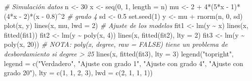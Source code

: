 \documentclass[
  spanish,
]{book}
\newenvironment{Shaded}{\begin{snugshade}}{\end{snugshade}}
\newcommand{\AttributeTok}[1]{\textcolor[rgb]{0.77,0.63,0.00}{#1}}
\newcommand{\CommentTok}[1]{\textcolor[rgb]{0.56,0.35,0.01}{\textit{#1}}}
\newcommand{\DecValTok}[1]{\textcolor[rgb]{0.00,0.00,0.81}{#1}}
\newcommand{\FloatTok}[1]{\textcolor[rgb]{0.00,0.00,0.81}{#1}}
\newcommand{\FunctionTok}[1]{\textcolor[rgb]{0.00,0.00,0.00}{#1}}
\newcommand{\NormalTok}[1]{#1}
\newcommand{\OtherTok}[1]{\textcolor[rgb]{0.56,0.35,0.01}{#1}}
\newcommand{\SpecialCharTok}[1]{\textcolor[rgb]{0.00,0.00,0.00}{#1}}
\newcommand{\StringTok}[1]{\textcolor[rgb]{0.31,0.60,0.02}{#1}}
\theoremstyle{break}
\theoremstyle{definition}
\theoremstyle{definition}
\theoremstyle{definition}
\theoremstyle{definition}
\theoremstyle{remark}
\begin{document}
\begin{Shaded}
\begin{Highlighting}[]
\CommentTok{\# Simulación datos}
\NormalTok{n }\OtherTok{\textless{}{-}} \DecValTok{30}
\NormalTok{x }\OtherTok{\textless{}{-}} \FunctionTok{seq}\NormalTok{(}\DecValTok{0}\NormalTok{, }\DecValTok{1}\NormalTok{, }\AttributeTok{length =}\NormalTok{ n)}
\NormalTok{mu }\OtherTok{\textless{}{-}} \DecValTok{2} \SpecialCharTok{+} \DecValTok{4}\SpecialCharTok{*}\NormalTok{(}\DecValTok{5}\SpecialCharTok{*}\NormalTok{x }\SpecialCharTok{{-}} \DecValTok{1}\NormalTok{)}\SpecialCharTok{*}\NormalTok{(}\DecValTok{4}\SpecialCharTok{*}\NormalTok{x }\SpecialCharTok{{-}} \DecValTok{2}\NormalTok{)}\SpecialCharTok{*}\NormalTok{(x }\SpecialCharTok{{-}} \FloatTok{0.8}\NormalTok{)}\SpecialCharTok{\^{}}\DecValTok{2} \CommentTok{\# grado 4}
\NormalTok{sd }\OtherTok{\textless{}{-}} \FloatTok{0.5}
\FunctionTok{set.seed}\NormalTok{(}\DecValTok{1}\NormalTok{)}
\NormalTok{y }\OtherTok{\textless{}{-}}\NormalTok{ mu }\SpecialCharTok{+} \FunctionTok{rnorm}\NormalTok{(n, }\DecValTok{0}\NormalTok{, sd)}
\FunctionTok{plot}\NormalTok{(x, y) }
\FunctionTok{lines}\NormalTok{(x, mu, }\AttributeTok{lwd =} \DecValTok{2}\NormalTok{)}
\CommentTok{\# Ajuste de los modelos}
\NormalTok{fit1 }\OtherTok{\textless{}{-}} \FunctionTok{lm}\NormalTok{(y }\SpecialCharTok{\textasciitilde{}}\NormalTok{ x)}
\FunctionTok{lines}\NormalTok{(x, }\FunctionTok{fitted}\NormalTok{(fit1))}
\NormalTok{fit2 }\OtherTok{\textless{}{-}} \FunctionTok{lm}\NormalTok{(y }\SpecialCharTok{\textasciitilde{}} \FunctionTok{poly}\NormalTok{(x, }\DecValTok{4}\NormalTok{))}
\FunctionTok{lines}\NormalTok{(x, }\FunctionTok{fitted}\NormalTok{(fit2), }\AttributeTok{lty =} \DecValTok{2}\NormalTok{)}
\NormalTok{fit3 }\OtherTok{\textless{}{-}} \FunctionTok{lm}\NormalTok{(y }\SpecialCharTok{\textasciitilde{}} \FunctionTok{poly}\NormalTok{(x, }\DecValTok{20}\NormalTok{)) }
\CommentTok{\# NOTA: poly(x, degree, raw = FALSE) tiene un problema de desbordamiento si degree \textgreater{} 25}
\FunctionTok{lines}\NormalTok{(x, }\FunctionTok{fitted}\NormalTok{(fit3), }\AttributeTok{lty =} \DecValTok{3}\NormalTok{)}
\FunctionTok{legend}\NormalTok{(}\StringTok{"topright"}\NormalTok{, }\AttributeTok{legend =} \FunctionTok{c}\NormalTok{(}\StringTok{"Verdadero"}\NormalTok{, }\StringTok{"Ajuste con grado 1"}\NormalTok{, }
                              \StringTok{"Ajuste con grado 4"}\NormalTok{, }\StringTok{"Ajuste con grado 20"}\NormalTok{), }
       \AttributeTok{lty =} \FunctionTok{c}\NormalTok{(}\DecValTok{1}\NormalTok{, }\DecValTok{1}\NormalTok{, }\DecValTok{2}\NormalTok{, }\DecValTok{3}\NormalTok{), }\AttributeTok{lwd =} \FunctionTok{c}\NormalTok{(}\DecValTok{2}\NormalTok{, }\DecValTok{1}\NormalTok{, }\DecValTok{1}\NormalTok{, }\DecValTok{1}\NormalTok{))}
\end{Highlighting}
\end{Shaded}
\end{document}
